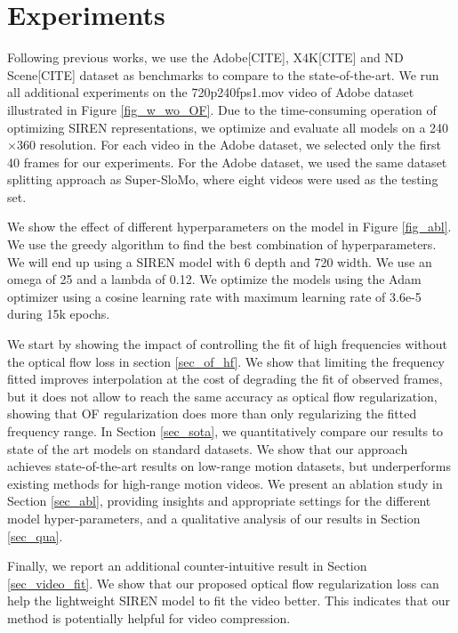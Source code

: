 \documentclass{article}
\begin{document}
\section{Experiments}

Following previous works, we use the Adobe[CITE], X4K[CITE] and ND Scene[CITE] dataset as benchmarks to compare to the state-of-the-art.
We run all additional experiments on the 720p240fps1.mov video of Adobe dataset illustrated in Figure \ref{fig_w_wo_OF}.
Due to the time-consuming operation of optimizing SIREN representations, we optimize and evaluate all models on a 240$\times$360 resolution.
For each video in the Adobe dataset, we selected only the first 40 frames for our experiments.
For the Adobe dataset, we used the same dataset splitting approach as Super-SloMo, where eight videos were used as the testing set.

We show the effect of different hyperparameters on the model in Figure \ref{fig_abl}.
We use the greedy algorithm to find the best combination of hyperparameters.
We will end up using a SIREN model with 6 depth and 720 width.
We use an omega of 25 and a lambda of 0.12.
We optimize the models using the Adam optimizer using a cosine learning rate with maximum learning rate of 3.6e-5 during 15k epochs.

We start by showing the impact of controlling the fit of high frequencies without the optical flow loss in section \ref{sec_of_hf}.
We show that limiting the frequency fitted improves interpolation at the cost of degrading the fit of observed frames,
but it does not allow to reach the same accuracy as optical flow regularization,
showing that OF regularization does more than only regularizing the fitted frequency range.
In Section \ref{sec_sota}, we quantitatively compare our results to state of the art models on standard datasets.
We show that our approach achieves state-of-the-art results on low-range motion datasets,
but underperforms existing methods for high-range motion videos.
We present an ablation study in Section \ref{sec_abl},
providing insights and appropriate settings for the different model hyper-parameters,
and a qualitative analysis of our results in Section \ref{sec_qua}.

Finally, we report an additional counter-intuitive result in Section \ref{sec_video_fit}.
We show that our proposed optical flow regularization loss can help the lightweight SIREN model to fit the video better.
This indicates that our method is potentially helpful for video compression.
\end{document}
